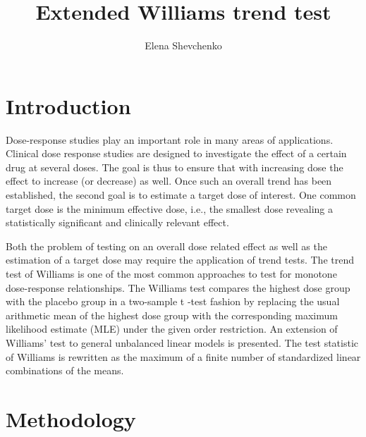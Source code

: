 \documentclass[14pt]{extarticle}
\date{\displaydate{date}}
\begin{document}
\title{Extended Williams trend test}
\author{Elena Shevchenko}


\maketitle










\section*{Introduction}


\hspace{\parindent} Dose-response studies play an important role in many areas of applications. Clinical dose response studies are designed to investigate the effect of a certain drug at several doses. The goal is thus to ensure that with increasing dose the effect to increase (or decrease) as well. Once such an overall trend has been established, the second goal is to estimate a target dose of interest. One common target dose is the minimum effective dose, i.e., the smallest dose revealing a statistically significant and clinically relevant effect.


Both the problem of testing on an overall dose related effect as well as the estimation of a target dose may require the application of trend tests. The trend test of Williams is one of the most common approaches to test for monotone dose-response relationships. The Williams test compares the highest dose group with the placebo group in a two-sample t -test fashion
by replacing the usual arithmetic mean of the highest dose group with the corresponding maximum likelihood estimate (MLE) under the given order restriction. An extension of Williams' test to general unbalanced linear models is presented. The test statistic of Williams is rewritten as the maximum of a finite number of standardized linear combinations of the means.

\section*{Methodology}
\end{document}
